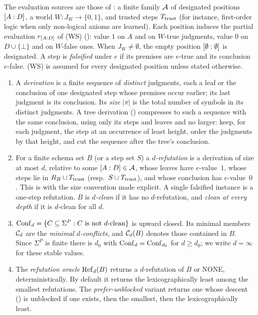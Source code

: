 The evaluation sources are those of : a finite family $\mathcal{A}$ of designated positions $[A : D]$, a world $W:J_W\to\{0,1\}$, and trusted steps $T_{\mathrm{trust}}$ (for instance, first-order logic when only non-logical axioms are learned). Each position induces the partial evaluation $e_{[A : D]}$ of (WS) (): value $1$ on $A$ and on $W$-true judgments, value $0$ on $D\cup\{\bot\}$ and on $W$-false ones. When $J_W\neq\emptyset$, the empty position $[\emptyset : \emptyset]$ is designated. A step is \emph{falsified} under $e$ if its premises are $e$-true and its conclusion $e$-false. (WS) is assumed for every designated position unless stated otherwise.

\begin{definition}\label{def:twotier:refutation}
\leavevmode
\begin{enumerate}[label=(\alph*),leftmargin=*]
\item A \emph{derivation} is a finite sequence of \emph{distinct} judgments, each a leaf or the conclusion of one designated step whose premises occur earlier; its last judgment is its conclusion. Its \emph{size} $|\pi|$ is the total number of symbols in its distinct judgments. A tree derivation () compresses to such a sequence with the same conclusion, using only its steps and leaves and no larger: keep, for each judgment, the step at an occurrence of least height, order the judgments by that height, and cut the sequence after the tree's conclusion.
\item For a finite schema set $B$ (or a step set $S$) a \emph{$d$-refutation} is a derivation of size at most $d$, relative to some $[A : D]\in\mathcal{A}$, whose leaves have $e$-value~$1$, whose steps lie in $R_B\cup T_{\mathrm{trust}}$ (resp.\ $S\cup T_{\mathrm{trust}}$), and whose conclusion has $e$-value~$0$. This is  with the size convention made explicit. A single falsified instance is a one-step refutation. $B$ is \emph{$d$-clean} if it has no $d$-refutation, and \emph{clean at every depth} if it is $d$-clean for all $d$.
\item $\mathrm{Conf}_d=\{C\subseteq\Sigma^P: C\text{ is not $d$-clean}\}$ is upward closed. Its minimal members $\mathcal{C}_d$ are the \emph{minimal $d$-conflicts}, and $\mathcal{C}_d(B)$ denotes those contained in $B$. Since $\Sigma^P$ is finite there is $d_0$ with $\mathrm{Conf}_d=\mathrm{Conf}_{d_0}$ for $d\ge d_0$; we write $d=\infty$ for these stable values.
\item The \emph{refutation oracle} $\mathrm{Ref}_d(B)$ returns a $d$-refutation of $B$ or NONE, deterministically. By default it returns the lexicographically least among the smallest refutations. The \emph{prefer-unblocked} variant returns one whose descent () is unblocked if one exists, then the smallest, then the lexicographically least.
\end{enumerate}
\end{definition}

